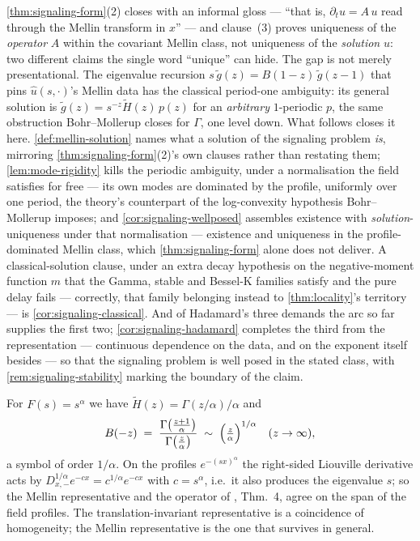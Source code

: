 \ref{thm:signaling-form}(2) closes with an informal gloss --- ``that is, $\partial_t u = A\,u$ read
through the Mellin transform in $x$'' --- and clause~(3) proves uniqueness of the \emph{operator}
$A$ within the covariant Mellin class, not uniqueness of the \emph{solution} $u$: two different
claims the single word ``unique'' can hide. The gap is not merely presentational. The eigenvalue
recursion $s\,\tilde g(z) = B(1-z)\,\tilde g(z-1)$ that pins $\hat u(s,\cdot)$'s Mellin data has the
classical period-one ambiguity: its general solution is $\tilde g(z) = s^{-z}\tilde H(z)\,p(z)$ for
an \emph{arbitrary} $1$-periodic $p$, the same obstruction Bohr--Mollerup closes for $\Gamma$, one
level down. What follows closes it here. \ref{def:mellin-solution} names what a solution of the
signaling problem \emph{is}, mirroring \ref{thm:signaling-form}(2)'s own clauses rather than
restating them; \ref{lem:mode-rigidity} kills the periodic ambiguity, under a normalisation the
field satisfies for free --- its own modes are dominated by the profile, uniformly over one period,
the theory's counterpart of the log-convexity hypothesis Bohr--Mollerup imposes; and
\ref{cor:signaling-wellposed} assembles existence with \emph{solution}-uniqueness under that
normalisation --- existence and uniqueness in the profile-dominated Mellin class, which
\ref{thm:signaling-form} alone does not deliver. A classical-solution clause, under an extra decay hypothesis on the negative-moment
function $m$ that the Gamma, stable and Bessel-K families satisfy and the pure delay fails ---
correctly, that family belonging instead to \ref{thm:locality}'s territory --- is
\ref{cor:signaling-classical}. And of Hadamard's three demands the arc so far supplies the
first two; \ref{cor:signaling-hadamard} completes the third from the representation ---
continuous dependence on the data, and on the exponent itself besides --- so that the
signaling problem is well posed in the stated class, with \ref{rem:signaling-stability}
marking the boundary of the claim.

\begin{example}\label{ex:stable-signaling}
For $F(s) = s^\alpha$ we have $\tilde H(z) = \Gamma(z/\alpha)/\alpha$ and
\[
  B(-z) \;=\; \frac{\Gamma\bigl(\tfrac{z+1}{\alpha}\bigr)}{\Gamma\bigl(\tfrac{z}{\alpha}\bigr)}
  \;\sim\; \Bigl(\tfrac{z}{\alpha}\Bigr)^{1/\alpha} \quad (z \to \infty),
\]
a symbol of order $1/\alpha$. On the profiles $e^{-(sx)^\alpha}$ the right-sided Liouville
derivative acts by $D^{1/\alpha}_{x,-} e^{-cx} = c^{1/\alpha} e^{-cx}$ with $c = s^\alpha$,
i.e.\ it also produces the eigenvalue $s$; so the Mellin representative and the operator of
, Thm.~4, agree on the span of the field profiles. The
translation-invariant representative is a coincidence of homogeneity; the Mellin
representative is the one that survives in general.
\end{example}

